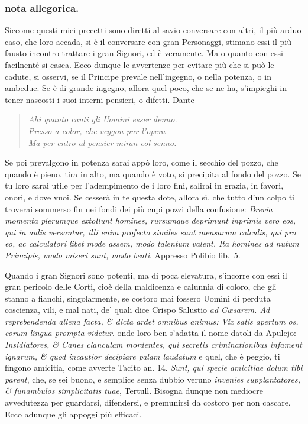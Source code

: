 \documentclass[11pt,a6paper]{article}
\newcommand{\literaryquote}[1]{%
\kern -6pt  \begin{verse}
    {\footnotesize \it #1}
  \end{verse}\kern -2pt%
}
\begin{document}
\subsubsection{nota allegorica.}
{\footnotesize
Siccome questi miei precetti sono diretti al savio
conversare con altri, il più arduo caso, che loro
accada, si è il conversare con gran Personaggi,
stimano essi il più fausto incontro trattare i gran Signori,
ed è veramente. Ma o quanto con essi facilnenté si
casca. Ecco dunque le avvertenze per evitare più
che si può le cadute, si osservi, se il Principe prevale
nell'ingegno, o nella potenza, o in ambedue.
Se è di grande ingegno, allora quel poco, che se ne
ha, s'impieghi in tener nascosti i suoi interni pensieri,
o difetti. Dante

\literaryquote{
Ahi quanto cauti gli Uomini esser denno.\\
 Presso a color, che veggon pur l'opera\\
 Ma per entro al pensier miran col senno.}

Se poi prevalgono in potenza sarai appò loro,
come il secchio del pozzo, che quando è pieno,
tira in alto, ma quando è voto, si precipita al fondo
del pozzo. Se tu loro sarai utile per l'adempimento
de i loro fini, salirai in grazia, in favori, onori, e
dove vuoi. Se cesserà in te questa dote, allora sì,
che tutto d'un colpo ti troverai sommerso fin nei
fondi dei più cupi pozzi della confusione: \textit{Brevia
momenta plerumque extollunt homines, rursumque
deprimunt inprimis vero eos, qui in aulis versantur,
illi enim profecto similes sunt mensarum calculis,
qui pro eo, ac calculatori libet mode assem, modo
talentum valent. Ita homines ad nutum Principis,
modo miseri sunt, modo beati}. Appresso Polibio
lib.\ 5.

Quando i gran Signori sono potenti, ma di poca
elevatura, s'incorre con essi il gran pericolo delle
Corti, cioè della maldicenza e calunnia di coloro,
che gli stanno a fianchi, singolarmente, se costoro
mai fossero Uomini di perduta coscienza, vili,
e mal nati, de' quali dice Crispo Salustio \textit{ad Cæsarem.
 Ad reprebendenda aliena facta, \& dicta ardet
 omnibus animus: Vix satis apertum os, eorum
 lingua prompta videtur}. onde loro ben s'adatta il
nome datoli da Apulejo: \textit{Insidiatores, \& Canes
clanculam mordentes, qui secretis criminationibus
infament ignarum, \& quod incautior decipiare palam
laudatum} e quel, che è peggio, ti fingono
amicitia, come avverte Tacito an. 14. \textit{Sunt, qui
specie amicitiae dolum tibi parent}, che, se sei buono,
e semplice senza dubbio veruno \textit{invenies supplantatores,
 \& funambulos simplicitatis tuae}, Tertull. Bisogna
dunque non mediocre avvedutezza per guardarsi,
difendersi, e premunirsi da costoro per non
cascare. Ecco adunque gli appoggi più efficaci.

}
\end{document}
